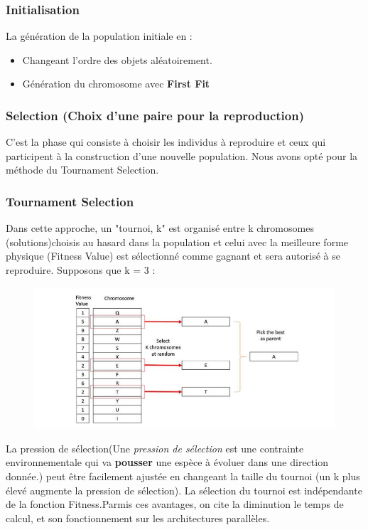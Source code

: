 \documentclass{article}
\begin{document}
\subsubsection{Initialisation}
La génération de la population initiale en :
		\begin{itemize}
			\item Changeant l’ordre des objets aléatoirement.
			\item Génération du chromosome avec \textbf{First Fit}
		\end{itemize}
\subsubsection{Selection (Choix d'une paire pour la reproduction)}
C’est la phase qui consiste à choisir les individus à reproduire et ceux qui participent à la construction d’une nouvelle population. Nous avons opté pour la méthode du Tournament Selection.
\subsubsection{Tournament Selection}
Dans cette approche, un "tournoi, k" est organisé entre k chromosomes (solutions)choisis au hasard dans la population et celui avec la meilleure forme physique (Fitness Value) est sélectionné comme gagnant et sera autorisé à se reproduire.
\newline
Supposons que k = 3 :
\begin{figure}[H]
  \includegraphics[width=\linewidth]{../figures/pic04.PNG}
\end{figure}
La pression de sélection(Une \textit{pression de sélection} est une contrainte environnementale qui va \textbf{pousser} une espèce à évoluer dans une direction donnée.) peut être facilement ajustée en changeant la taille du tournoi (un k plus élevé augmente la pression de sélection).
La sélection du tournoi est indépendante de la fonction Fitness.Parmis ces avantages, on cite la diminution le temps de calcul, et son fonctionnement sur les architectures parallèles.
\end{document}
